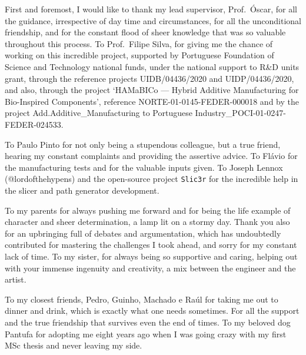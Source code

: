 
%

\begin{ntacknowledgements}

  First and foremost, I would like to thank my lead supervisor, Prof.~\'{O}scar, for all the guidance, irrespective of day
time and circumstances, for all the unconditional friendship, and for the constant flood of sheer knowledge that was
so valuable throughout this process.
To Prof.~Filipe Silva, for giving me the chance of working on this
incredible project, supported by Portuguese Foundation of Science and Technology
national funds, under the national support to R\&D units grant, through the
reference projects UIDB/04436/2020 and UIDP/04436/2020, and also, through the
project `HAMaBICo --- Hybrid Additive Manufacturing for Bio-Inspired
Components', reference NORTE-01-0145-FEDER-000018 and by the project
Add.Additive\_Manufacturing to Portuguese Industry\_POCI-01-0247-FEDER-024533.

To Paulo Pinto for not only being a stupendous colleague, but a true
friend, hearing my constant complaints and providing the assertive advice. To
Flávio for the manufacturing tests and for the valuable inputs given. To
Joseph Lennox (@lordofthehypens) and the open-source project \texttt{Slic3r} for the incredible help in the slicer and path generator development.

To my parents for always pushing me forward and for being the life example of character and sheer determination, a
lamp lit on a stormy day. Thank you also for an upbringing full of debates and
argumentation, which has undoubtedly contributed for mastering the challenges I
took ahead,
and sorry for my constant lack of time.
To my sister, for always being so supportive and caring, helping out with your
immense ingenuity and creativity, a mix between the engineer and the artist.

To my closest friends, Pedro, Guinho, Machado e Raúl for taking me out to dinner
and drink, which is exactly what one needs sometimes. For all the support and
the true friendship that survives even the end of times. To my beloved dog
Pantufa for adopting me eight years ago when I was going crazy with my
first MSc thesis and never leaving my side.


\end{ntacknowledgements}
